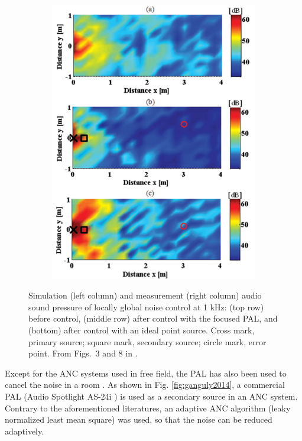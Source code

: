 \begin{figure}[!htb]
    \begin{subfigure}{0.4\textwidth}
        \centering
        \includegraphics[width = \textwidth]{fig/tanaka2011fig8_resize.png}
    \end{subfigure}
    \caption{Simulation (left column) and measurement (right column) audio sound pressure of locally global noise control at 1 kHz: 
        (top row) before control, (middle row) after control with the focused PAL, and (bottom) after control with an ideal point source. 
    Cross mark, primary source; square mark, secondary source; circle mark, error point.
    From Figs.~3 and 8 in \cite{Tanaka2011MathematicallyTrivialControl}.
}
    \label{fig:tanaka2011we90fsf}
\end{figure}


Except for the ANC systems used in free field, the PAL has also been used to cancel the noise in a room \cite{Ganguly2014RealtimeRemoteCancellation}.
As shown in Fig. \ref{fig:ganguly2014}, a commercial PAL (Audio Spotlight AS-24i \cite{HolosonicsAudioSpotlight24i}) is used as a secondary source in an ANC system. 
Contrary to the aforementioned literatures, an adaptive ANC algorithm (leaky normalized least mean square) was used, so that the  noise can be reduced adaptively.

